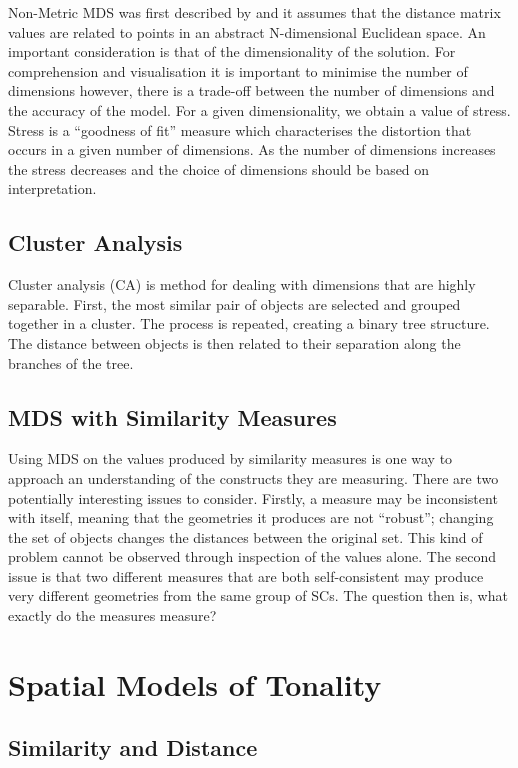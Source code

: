 \documentclass{article}
\begin{document}
Non-Metric MDS was first described by \citet{Shepard1962} and it
assumes that the distance matrix values are related to points in an
abstract N-dimensional Euclidean space. An important consideration is
that of the dimensionality of the solution. For comprehension and
visualisation it is important to minimise the number of dimensions
however, there is a trade-off between the number of dimensions and the
accuracy of the model. For a given dimensionality, we obtain a value
of stress. Stress is a ``goodness of fit'' measure which characterises
the distortion that occurs in a given number of dimensions. As the
number of dimensions increases the stress decreases and the choice of
dimensions should be based on interpretation.
\subsection{Cluster Analysis}
\label{sec-4-2}

Cluster analysis (CA) is method for dealing with dimensions that are
highly separable. First, the most similar pair of objects are selected
and grouped together in a cluster. The process is repeated, creating a
binary tree structure. The distance between objects is then related to
their separation along the branches of the tree.
\subsection{MDS with Similarity Measures}
\label{sec-4-3}

Using MDS on the values produced by similarity measures is one way to
approach an understanding of the constructs they are measuring. There
are two potentially interesting issues to consider. Firstly, a measure
may be inconsistent with itself, meaning that the geometries it
produces are not ``robust''; changing the set of objects changes the
distances between the original set. This kind of problem cannot be
observed through inspection of the values alone. The second issue is
that two different measures that are both self-consistent may produce
very different geometries from the same group of SCs. The question
then is, what exactly do the measures measure?

\section{Spatial Models of Tonality}
\label{sec-5}
\subsection{Similarity and Distance}
\label{sec-5-1}
\end{document}
